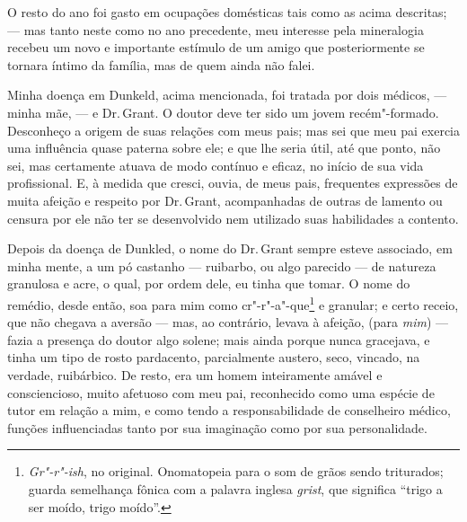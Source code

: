 O resto do ano foi gasto em ocupações domésticas tais como as acima
descritas; --- mas tanto neste como no ano precedente, meu interesse pela
mineralogia recebeu um novo e importante estímulo de um amigo que
posteriormente se tornara íntimo da família, mas de quem ainda não
falei.

Minha doença em Dunkeld, acima mencionada, foi tratada por dois médicos,
--- minha mãe, --- e Dr.\,Grant. O doutor deve ter sido um jovem
recém"-formado. Desconheço a origem de suas relações com meus pais; mas
sei que meu pai exercia uma influência quase paterna sobre ele; e que
lhe seria útil, até que ponto, não sei, mas certamente atuava de modo
contínuo e eficaz, no início de sua vida profissional. E, à medida que
cresci, ouvia, de meus pais, frequentes expressões de muita afeição e
respeito por Dr.\,Grant, acompanhadas de outras de lamento ou censura por
ele não ter se desenvolvido nem utilizado suas habilidades a contento.

Depois da doença de Dunkled, o nome do Dr.\,Grant sempre esteve
associado, em minha mente, a um pó castanho --- ruibarbo, ou algo
parecido --- de natureza granulosa e acre, o qual, por ordem dele, eu
tinha que tomar. O nome do remédio, desde então, soa para mim como
cr"-r"-a"-que\footnote{\textit{Gr"-r"-ish}, no original. Onomatopeia para o som
  de grãos sendo triturados; guarda semelhança fônica com a palavra
  inglesa \textit{grist}, que significa ``trigo a ser moído, trigo moído''.} e granular; e certo receio, que não chegava a aversão
--- mas, ao contrário, levava à afeição, (para \textit{mim}) --- fazia a
presença do doutor algo solene; mais ainda porque nunca gracejava, e
tinha um tipo de rosto pardacento, parcialmente austero, seco, vincado,
na verdade, ruibárbico. De resto, era um homem inteiramente amável e
consciencioso, muito afetuoso com meu pai, reconhecido como uma espécie
de tutor em relação a mim, e como tendo a responsabilidade de
conselheiro médico, funções influenciadas tanto por sua imaginação como
por sua personalidade.

